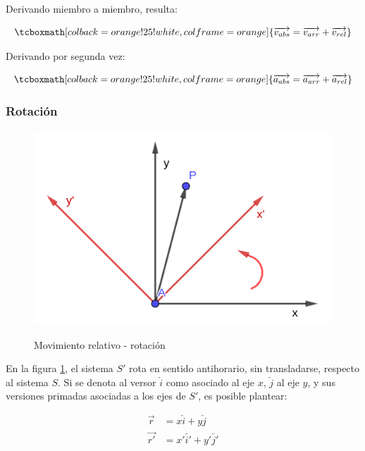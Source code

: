 \documentclass{article}
\begin{document}
Derivando miembro a miembro, resulta:

\begin{equation}
\tcboxmath[colback=orange!25!white,colframe=orange]{
\overrightarrow{v_{abs}} = \overrightarrow{v_{arr}} + \overrightarrow{v_{rel}}
}
\end{equation}

Derivando por segunda vez:

\begin{equation}
\tcboxmath[colback=orange!25!white,colframe=orange]{
\overrightarrow{a_{abs}} = \overrightarrow{a_{arr}} + \overrightarrow{a_{rel}}
}
\end{equation}

\subsubsection{Rotación}

\begin{figure}[ht]
\centering
\caption{Movimiento relativo - rotación}
\includegraphics[scale=1.3]{../../common/img/62.01/theory/04-kinematics-rel-mov-rot.png}
\label{fig:relMovRot}
\end{figure}

En la figura \ref{fig:relMovRot}, el sistema $S'$ rota en sentido antihorario, sin transladarse, respecto al sistema $S$. Si se denota al versor $\check{i}$ como asociado al eje $x$, $\check{j}$ al eje $y$, y sus versiones primadas asociadas a los ejes de $S'$, es posible plantear:

\begin{subequations}
\begin{align}
\overrightarrow{r} &= x \check{i} + y \check{j} \\
\overrightarrow{r'} &= x' \check{i'} + y' \check{j'}
\end{align}
\end{subequations}
\end{document}

